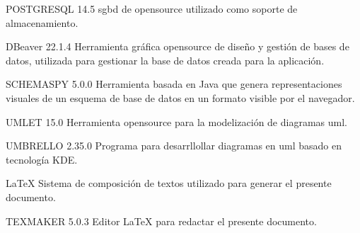  
 POSTGRESQL 14.5\newline
 \acrshort{sgbd} de \gls{opensource} utilizado como soporte de almacenamiento.
\newline
 
 DBeaver 22.1.4\newline
 Herramienta gráfica \gls{opensource} de diseño y gestión de bases de datos, utilizada para gestionar la base de datos creada para la aplicación.
 \newline

 SCHEMASPY 5.0.0\newline
 Herramienta basada en Java que genera representaciones visuales de un esquema de base de datos en un formato visible por el navegador.
 \newline
 
 UMLET 15.0\newline
 Herramienta \gls{opensource} para la modelización de diagramas \acrshort{uml}.
\newline

 
 UMBRELLO 2.35.0\newline
 Programa para desarrllollar diagramas en \acrfull{uml} basado en tecnología KDE.
 \newline
 
 \LaTeX{}\newline
 Sistema de composición de textos utilizado para generar el presente documento.
 \newline
 
 TEXMAKER 5.0.3\newline
 Editor \LaTeX{} para redactar el presente documento.
 \newline
 
 
 

	
